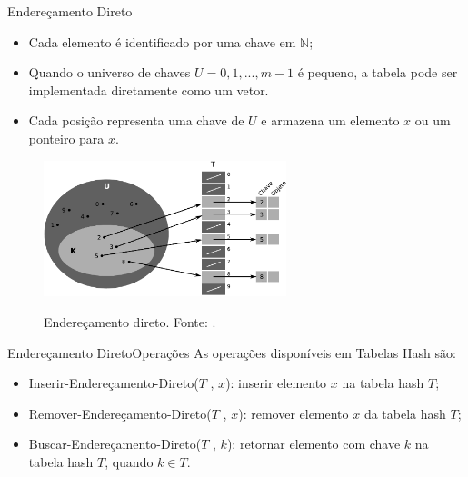 \documentclass[aspectratio=169]{beamer}
\begin{document}

\begin{frame}{Endereçamento Direto}
\begin{itemize}
 \item Cada elemento é identificado por uma chave em $\mathbb{N}$;
 \item Quando o universo de chaves $U = {0, 1, . . . , m - 1}$ é pequeno, a tabela pode ser implementada diretamente como um vetor.
 \item Cada posição representa uma chave de $U$ e armazena um elemento $x$ ou um ponteiro para $x$. 
\end{itemize}
\begin{figure}[!h]
  \centering
  \includegraphics[width=200pt]{imagens/tabela_enderecamento_direto.png}
  \label{fig_tabela_enderecamento_direto}
  \caption{Endereçamento direto. Fonte: .}
\end{figure}
\end{frame}


\begin{frame}{Endereçamento Direto}{Operações}
As operações disponíveis em Tabelas Hash são:
\begin{itemize}
 \item Inserir-Endereçamento-Direto($T$ , $x$): inserir elemento $x$ na tabela hash $T$;
 \item Remover-Endereçamento-Direto($T$ , $x$): remover elemento $x$ da tabela hash $T$;
 \item Buscar-Endereçamento-Direto($T$ , $k$): retornar elemento com chave $k$ na tabela hash $T$, quando $k \in T$.
\end{itemize}
\end{frame}
\end{document}
